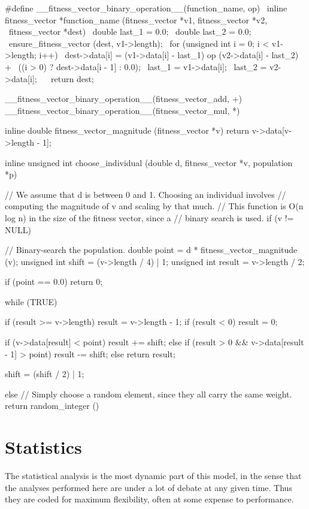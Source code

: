 \documentclass{article}
\begin{document}
\begin{ccode}
#define __fitness_vector_binary_operation__(function_name, op) \
inline fitness_vector *function_name (fitness_vector *v1, fitness_vector *v2, \
				      fitness_vector *dest) { \
  double last_1 = 0.0; \
  double last_2 = 0.0; \
  ensure_fitness_vector (dest, v1->length); \
  for (unsigned int i = 0; i < v1->length; i++) { \
   dest->data[i] = (v1->data[i] - last_1) op (v2->data[i] - last_2) + \
     ((i > 0) ? dest->data[i - 1] : 0.0); \
   last_1 = v1->data[i]; \
   last_2 = v2->data[i]; \
  } \
  return dest; \
}

__fitness_vector_binary_operation__(fitness_vector_add, +)
__fitness_vector_binary_operation__(fitness_vector_mul, *)

inline double fitness_vector_magnitude (fitness_vector *v)
  {return v->data[v->length - 1];}

inline unsigned int choose_individual (double d, fitness_vector *v, population *p) {
  // We assume that d is between 0 and 1. Choosing an individual involves
  // computing the magnitude of v and scaling by that much.
  // This function is O(n log n) in the size of the fitness vector, since a
  // binary search is used.
  if (v != NULL) {
    // Binary-search the population.
    double		point 	= d * fitness_vector_magnitude (v);
    unsigned int	shift 	= (v->length / 4) | 1;
    unsigned int	result 	= v->length / 2;

    if (point == 0.0)
      return 0;

    while (TRUE) {
      if (result >= v->length)	result = v->length - 1;
      if (result < 0)		result = 0;

      if (v->data[result] < point)
	result += shift;
      else if (result > 0 && v->data[result - 1] > point)
	result -= shift;
      else
	return result;

      shift = (shift / 2) | 1;
    }
  } else
    // Simply choose a random element, since they all carry the same weight.
    return random_integer () %
}
\end{ccode}

  \section{Statistics}
    \label{sec:statistics}

    The statistical analysis is the most dynamic part of this model, in the
    sense that the analyses performed here are under a lot of debate at any
    given time. Thus they are coded for maximum flexibility, often at some
    expense to performance.
\end{document}
